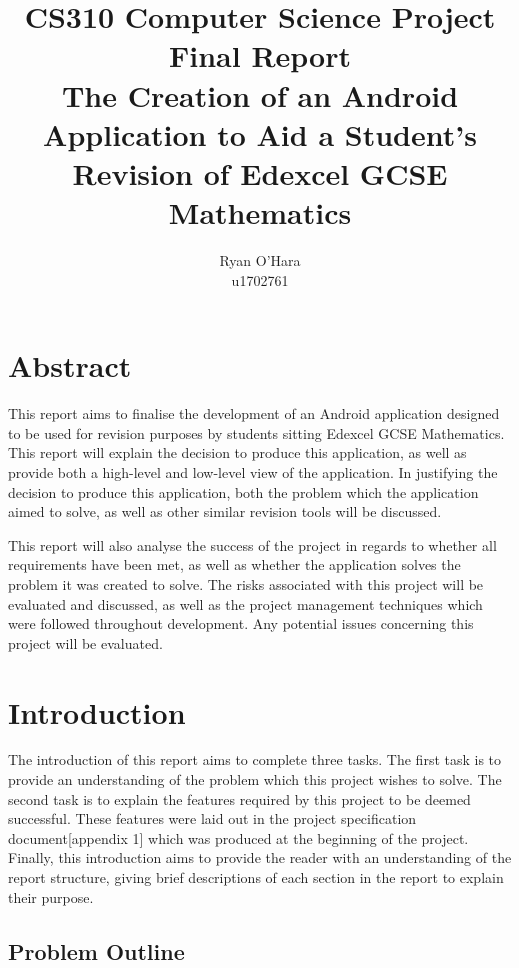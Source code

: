 \documentclass{article}
\title{CS310 Computer Science Project \\ Final Report \\ The Creation of an Android Application to Aid a Student's Revision of Edexcel GCSE Mathematics}
\author{Ryan O'Hara \\ u1702761}
\begin{document}
\maketitle

\newpage

\tableofcontents

\newpage

\section{Abstract}
\label{section:abstract}

This report aims to finalise the development of an Android application designed to be used for revision purposes by students sitting Edexcel GCSE Mathematics. This report will explain the decision to produce this application, as well as provide both a high-level and low-level view of the application. In justifying the decision to produce this application, both the problem which the application aimed to solve, as well as other similar revision tools will be discussed. \par

This report will also analyse the success of the project in regards to whether all requirements have been met, as well as whether the application solves the problem it was created to solve. The risks associated with this project will be evaluated and discussed, as well as the project management techniques which were followed throughout development. Any potential issues concerning this project will be evaluated. \par

\section{Introduction}
\label{section:introduction}

The introduction of this report aims to complete three tasks. The first task is to provide an understanding of the problem which this project wishes to solve. The second task is to explain the features required by this project to be deemed successful. These features were laid out in the project specification document[appendix 1] which was produced at the beginning of the project. Finally, this introduction aims to provide the reader with an understanding of the report structure, giving brief descriptions of each section in the report to explain their purpose.

\subsection{Problem Outline}
\end{document}
